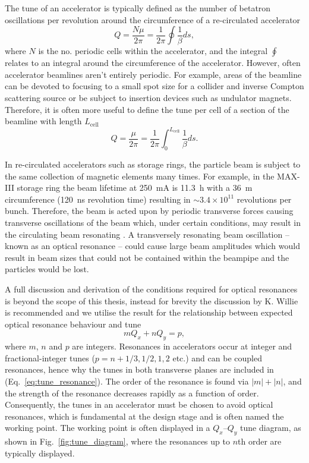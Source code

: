 \documentclass[../main.tex]{subfiles}
\begin{document}
The tune of an accelerator is typically defined as the number of betatron oscillations per revolution around the circumference of a re-circulated accelerator
\begin{equation}
Q=\frac{N\mu}{2\pi} = \frac{1}{2\pi}\oint\frac{1}{\beta}ds,
\label{eq:accelerator_tune}    
\end{equation}
where $N$ is the no. periodic cells within the accelerator, and the integral $\oint$ relates to an integral around the circumference of the accelerator. However, often accelerator beamlines aren't entirely periodic. For example, areas of the beamline can be devoted to focusing to a small spot size for a collider and inverse Compton scattering source or be subject to insertion devices such as undulator magnets. Therefore, it is often more useful to define the tune per cell of a section of the beamline with length $L_{\mathrm{cell}}$
\begin{equation}
Q=\frac{\mu}{2\pi} = \frac{1}{2\pi}\int_{0}^{L_{\mathrm{cell}}}\frac{1}{\beta}ds. 
\label{eq:tune_per_cell}    
\end{equation}

In re-circulated accelerators such as storage rings, the particle beam is subject to the same collection of magnetic elements many times. For example, in the MAX-III storage ring the beam lifetime at 250~\si{\milli\ampere} is 11.3~\si{\hour} with a 36~\si{\meter} circumference (120~\si{\nano\second} revolution time) resulting in $\sim3.4\times 10^{11}$ revolutions per bunch. Therefore, the beam is acted upon by periodic transverse forces causing transverse oscillations of the beam which, under certain conditions, may result in the circulating beam resonating \cite{wille2000physics}. A transversely resonating beam oscillation -- known as an optical resonance -- could cause large beam amplitudes which would result in beam sizes that could not be contained within the beampipe and the particles would be lost.

A full discussion and derivation of the conditions required for optical resonances is beyond the scope of this thesis, instead for brevity the discussion by K. Willie \cite{wille2000physics} is recommended and we utilise the result for the relationship between expected optical resonance behaviour and tune
\begin{equation}
mQ_{x}+nQ_{y} = p,
\label{eq:tune_resonances}    
\end{equation}
where $m$, $n$ and $p$ are integers. Resonances in accelerators occur at integer and fractional-integer tunes ($p = n + 1/3, 1/2, 1, 2$ etc.) and can be coupled resonances, hence why the tunes in both transverse planes are included in (Eq.~\ref{eq:tune_resonance}). The order of the resonance is found via $\left|m\right| + \left|n\right|$, and the strength of the resonance decreases rapidly as a function of order. Consequently, the tunes in an accelerator must be chosen to avoid optical resonances, which is fundamental at the design stage and is often named the working point. The working point is often displayed in a $Q_{x}$--$Q_{y}$ tune diagram, as shown in Fig.~\ref{fig:tune_diagram}, where the resonances up to $n$th order are typically displayed.  
\end{document}
